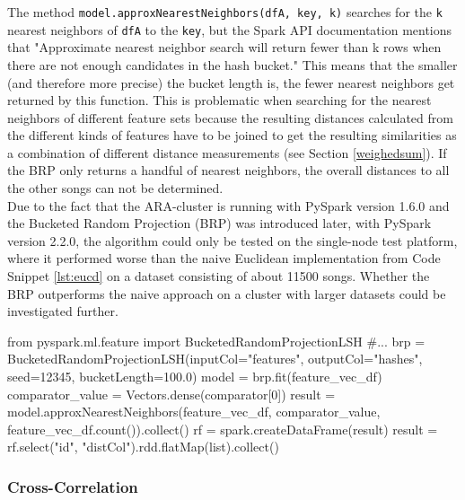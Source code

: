 \noindent The method \lstinline{model.approxNearestNeighbors(dfA, key, k)} searches for the \lstinline{k} nearest neighbors of \lstinline{dfA} to the \lstinline{key}, but the Spark API documentation mentions that "Approximate nearest neighbor search will return fewer than k rows when there are not enough candidates in the hash bucket." \cite{lshspark}
This means that the smaller (and therefore more precise) the bucket length is, the fewer nearest neighbors get returned by this function. This is problematic when searching for the nearest neighbors of different feature sets because the resulting distances calculated from the different kinds of features have to be joined to get the resulting similarities as a combination of different distance measurements (see Section \ref{weighedsum}). If the BRP only returns a handful of nearest neighbors, the overall distances to all the other songs can not be determined.\\
\noindent Due to the fact that the ARA-cluster is running with PySpark version 1.6.0 and the Bucketed Random Projection (BRP) was introduced later, with PySpark version 2.2.0, the algorithm could only be tested on the single-node test platform, where it performed worse than the naive Euclidean implementation from Code Snippet \ref{lst:eucd} on a dataset consisting of about 11500 songs. Whether the BRP outperforms the naive approach on a cluster with larger datasets could be investigated further. 

\begin{pythonCode}[frame=single,label={lst:brp},caption={Bucketed Random Projection},captionpos=b]
from pyspark.ml.feature import BucketedRandomProjectionLSH
#...
brp = BucketedRandomProjectionLSH(inputCol="features", outputCol="hashes", seed=12345, bucketLength=100.0)
model = brp.fit(feature_vec_df)
comparator_value = Vectors.dense(comparator[0])
result = model.approxNearestNeighbors(feature_vec_df, comparator_value, feature_vec_df.count()).collect()
rf = spark.createDataFrame(result)
result = rf.select("id", "distCol").rdd.flatMap(list).collect()
\end{pythonCode}

 

\subsubsection{Cross-Correlation}

